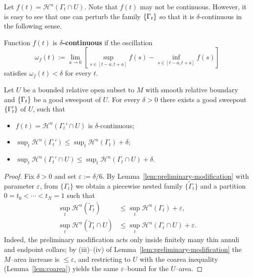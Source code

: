 Let $f(t) = \mathcal{H}^n(\Gamma_t\cap U)$. Note that $f(t)$ may not be continuous. However, it is easy
to see that one can perturb the family $\left\{\Gamma_t\right\}$ so that it is $\delta$-continuous in the
following sense.
\begin{definition}
    Function $f(t)$ is \textbf{$\delta$-continuous} if the oscillation
    \begin{equation*}
        \omega_f(t) := \lim_{a \to 0}[\sup_{s \in [t - a, t + a]}f(s) - \inf_{s \in [t - a, t + a]}f(s)]
    \end{equation*}
    satisfies $\omega_f(t) < \delta$ for every $t$.
\end{definition}
\begin{lemma}\label{lem:delta-cts-perturbation}
    Let $U$ be a bounded relative open subset to $M$ with smooth relative boundary and $\left\{\Gamma_t\right\}$ be a good sweepout of $U$. For every $\delta > 0$ there exists a good sweepout $\left\{\Gamma'_t\right\}$ of $U$, such that 
    \begin{itemize}
        \item $f(t) = \mathcal{H}^n(\Gamma_t'\cap U)$ is $\delta$-continuous;
        \item $\sup_{t}\mathcal{H}^n(\Gamma_t') \leq \sup_{t}\mathcal{H}^n(\Gamma_t) + \delta$;
        \item $\sup_{t}\mathcal{H}^n(\Gamma_t'\cap U) \leq \sup_{t}\mathcal{H}^n(\Gamma_t\cap U) + \delta$.
    \end{itemize}
    \begin{proof}
        Fix $\delta>0$ and set $\varepsilon:=\delta/6$.
        By Lemma~\ref{lem:preliminary-modification} with parameter $\varepsilon$, from $\{\Gamma_t\}$ we obtain a piecewise nested family $\{\widetilde{\Gamma}_t\}$ and a partition $0=t_0<\cdots<t_N=1$ such that
        \begin{equation*}
        \begin{split}
        \sup_{t}\mathcal{H}^n(\widetilde{\Gamma}_t)
        &\le \sup_{t}\mathcal{H}^n(\Gamma_t)+\varepsilon,\\
        \sup_{t}\mathcal{H}^n(\widetilde{\Gamma}_t\cap U)
        &\le \sup_{t}\mathcal{H}^n(\Gamma_t\cap U)+\varepsilon.
        \end{split}
        \end{equation*}
        Indeed, the preliminary modification acts only inside finitely many thin annuli and endpoint collars; by (iii)–(iv) of Lemma~\ref{lem:preliminary-modification} the $M$–area increase is $\le\varepsilon$, and restricting to $U$ with the coarea inequality (Lemma~\ref{lem:coarea}) yields the same $\varepsilon$–bound for the $U$–area.
    

\end{proof}
\end{lemma}
